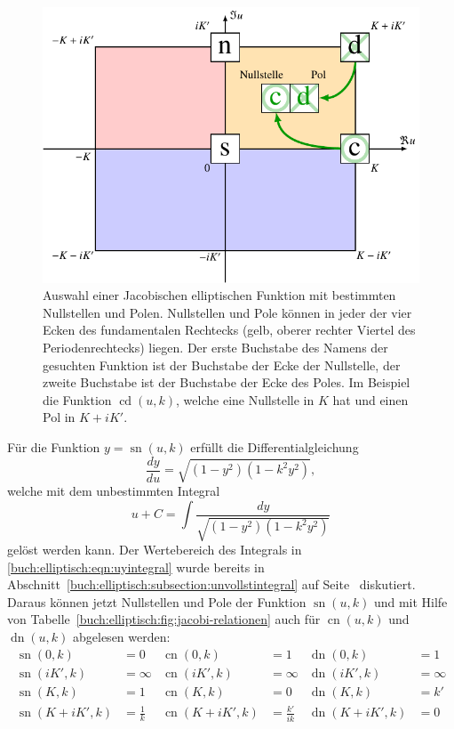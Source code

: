 \begin{figure}
\centering
\includegraphics{chapters/110-elliptisch/images/ellselection.pdf}
\caption{Auswahl einer Jacobischen elliptischen Funktion mit bestimmten
Nullstellen und Polen.
Nullstellen und Pole können in jeder der vier Ecken des fundamentalen
Rechtecks (gelb, oberer rechter Viertel des Periodenrechtecks) liegen.
Der erste Buchstabe des Namens der gesuchten Funktion ist der Buchstabe
der Ecke der Nullstelle, der zweite Buchstabe ist der Buchstabe der
Ecke des Poles.
Im Beispiel die Funktion $\operatorname{cd}(u,k)$, welche eine
Nullstelle in $K$ hat und einen Pol in $K+iK'$.
\label{buch:elliptisch:fig:selectell}}
\end{figure}
Für die Funktion $y=\operatorname{sn}(u,k)$ erfüllt die Differentialgleichung
\[
\frac{dy}{du}
=
\sqrt{(1-y^2)(1-k^2y^2)},
\]
welche mit dem unbestimmten Integral
\begin{equation}
u + C = \int\frac{dy}{\sqrt{(1-y^2)(1-k^2y^2)}}
\label{buch:elliptisch:eqn:uyintegral}
\end{equation}
gelöst werden kann.
Der Wertebereich des Integrals in \eqref{buch:elliptisch:eqn:uyintegral}
wurde bereits in
Abschnitt~\ref{buch:elliptisch:subsection:unvollstintegral}
auf Seite~\pageref{buch:elliptische:subsubsection:wertebereich}
diskutiert.
Daraus können jetzt Nullstellen und Pole der Funktion $\operatorname{sn}(u,k)$
und mit Hilfe von Tabelle~\ref{buch:elliptisch:fig:jacobi-relationen}
auch für $\operatorname{cn}(u,k)$ und $\operatorname{dn}(u,k)$
abgelesen werden:
\begin{equation}
\begin{aligned}
\operatorname{sn}(0,k)&=0
&
\operatorname{cn}(0,k)&=1
&
\operatorname{dn}(0,k)&=1
\\
\operatorname{sn}(iK',k)&=\infty
&
\operatorname{cn}(iK',k)&=\infty
&
\operatorname{dn}(iK',k)&=\infty
\\
\operatorname{sn}(K,k)&=1
&
\operatorname{cn}(K,k)&=0
&
\operatorname{dn}(K,k)&=k'
\\
\operatorname{sn}(K+iK',k)&=\frac{1}{k}
&
\operatorname{cn}(K+iK',k)&=\frac{k'}{ik}
&
\operatorname{dn}(K+iK',k)&=0
\end{aligned}
\label{buch:elliptische:eqn:eckwerte}
\end{equation}
